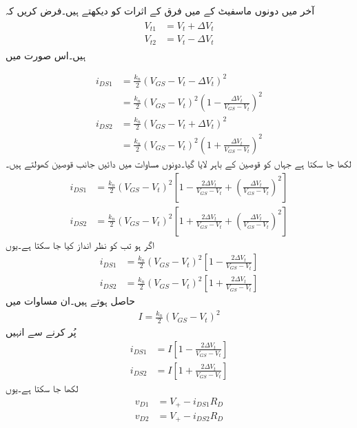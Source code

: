 آخر میں دونوں ماسفیٹ کے  میں فرق کے اثرات کو دیکھتے ہیں۔فرض کریں کہ
\begin{gather}
\begin{aligned}
V_{t1}&=V_t+\Delta V_t\\
V_{t2}&=V_t-\Delta V_t
\end{aligned}
\end{gather}
ہیں۔اس صورت میں

\begin{align*}
i_{DS1}&=\frac{k_n}{2} \left(V_{GS}-V_t-\Delta V_t \right)^2\\
&=\frac{k_n}{2} \left(V_{GS}-V_t \right)^2 \left(1-\frac{\Delta V_t}{V_{GS}-V_t} \right)^2\\
i_{DS2}&=\frac{k_n}{2} \left(V_{GS}-V_t+\Delta V_t \right)^2\\
&=\frac{k_n}{2} \left(V_{GS}-V_t \right)^2 \left(1+\frac{\Delta V_t}{V_{GS}-V_t} \right)^2
\end{align*}
لکھا جا سکتا ہے جہاں  کو قوصین کے باہر لایا گیا۔دونوں مساوات میں دائیں جانب قوصین کھولتے ہیں۔
\begin{align*}
i_{DS1}&=\frac{k_n}{2} \left(V_{GS}-V_t \right)^2 \left[1-\frac{2 \Delta V_t}{V_{GS}-V_t}+\left(\frac{\Delta V_t}{V_{GS}-V_t}\right)^2   \right]\\
i_{DS2}&=\frac{k_n}{2} \left(V_{GS}-V_t \right)^2 \left[1+\frac{2 \Delta V_t}{V_{GS}-V_t}+\left(\frac{\Delta V_t}{V_{GS}-V_t}\right)^2   \right]
\end{align*}
اگر   ہو تب   کو نظر انداز کیا جا سکتا ہے۔یوں
\begin{align*}
i_{DS1}&=\frac{k_n}{2} \left(V_{GS}-V_t \right)^2 \left[1-\frac{2 \Delta V_t}{V_{GS}-V_t}\right]\\
i_{DS2}&=\frac{k_n}{2} \left(V_{GS}-V_t \right)^2 \left[1+\frac{2 \Delta V_t}{V_{GS}-V_t}\right]
\end{align*}
حاصل ہوتے ہیں۔ان مساوات میں
\begin{align*}
I=\frac{k_n}{2} \left(V_{GS}-V_t \right)^2 
\end{align*}
پُر کرنے سے انہیں
\begin{align*}
i_{DS1}&=I \left[1-\frac{2 \Delta V_t}{V_{GS}-V_t}\right]\\
i_{DS2}&=I \left[1+\frac{2 \Delta V_t}{V_{GS}-V_t}\right]
\end{align*}
لکھا جا سکتا ہے۔یوں
\begin{align*}
v_{D1}&=V_{+}- i_{DS1} R_D\\
v_{D2}&=V_{+}-i_{DS2} R_D
\end{align*}
